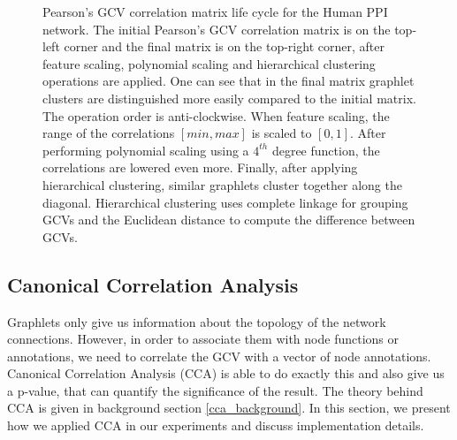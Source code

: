 \begin{figure}[h!]
\begin{tikzpicture}[scale=1.0,auto,swap,post/.style={->,shorten >=3pt,>=stealth',thick}]
  \end{tikzpicture}
  \caption[Pearson's GCV correlation matrix life cycle for the Human PPI network]{Pearson's GCV correlation matrix life cycle for the Human PPI network. The initial Pearson's GCV correlation matrix is on the top-left corner and the final matrix is on the top-right corner, after feature scaling, polynomial scaling and hierarchical clustering operations are applied. One can see that in the final matrix graphlet clusters are distinguished more easily compared to the initial matrix. The operation order is anti-clockwise. When feature scaling, the range of the correlations $[min, max]$ is scaled to $[0,1]$. After performing polynomial scaling using a $4^{th}$ degree function, the correlations are lowered even more. Finally, after applying hierarchical clustering, similar graphlets cluster together along the diagonal. Hierarchical clustering uses complete linkage for grouping GCVs and the Euclidean distance to compute the difference between GCVs.}
  \label{fig:heatmap_process}
\end{figure}%


\subsection{Canonical Correlation Analysis}

Graphlets only give us information about the topology of the network connections. However, in order to associate them with node functions or annotations, we need to correlate the GCV with a vector of node annotations. Canonical Correlation Analysis (CCA) is able to do exactly this and also give us a p-value, that can quantify the significance of the result. The theory behind CCA is given in background section \ref{cca_background}. In this section, we present how we applied CCA in our experiments and discuss implementation details.

